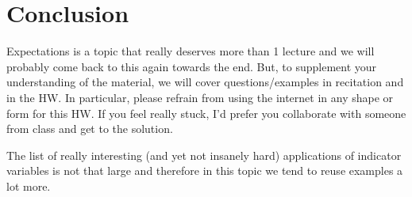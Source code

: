 \documentclass[12pt]{article}
\begin{document}
\section*{Conclusion}
Expectations is a topic that really deserves more than 1 lecture and we will probably come back to this again towards the end. But, to supplement your understanding of the material, we will cover questions/examples in recitation and in the HW. In particular, please refrain from using the internet in any shape or form for this HW. If you feel really stuck, I'd prefer you collaborate with someone from class and get to the solution. 

The list of really interesting (and yet not insanely hard) applications of indicator variables is not that large and therefore in this topic we tend to reuse examples a lot more. 
\end{document}
